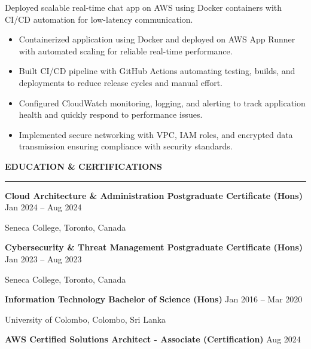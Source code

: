 \documentclass[10pt,letterpaper]{article}
\begin{document}
\vspace{-1pt}

Deployed scalable real-time chat app on AWS using Docker containers with CI/CD automation for low-latency communication.
\vspace{-1pt}
\begin{itemize}
\item Containerized application using Docker and deployed on AWS App Runner with automated scaling for reliable real-time performance.
\item Built CI/CD pipeline with GitHub Actions automating testing, builds, and deployments to reduce release cycles and manual effort.
\item Configured CloudWatch monitoring, logging, and alerting to track application health and quickly respond to performance issues.
\item Implemented secure networking with VPC, IAM roles, and encrypted data transmission ensuring compliance with security standards.
\end{itemize}

\vspace{6pt}

\textbf{EDUCATION \& CERTIFICATIONS}\\[-8pt]
\noindent\rule{\textwidth}{1pt}

\vspace{-2pt}

\textbf{Cloud Architecture \& Administration Postgraduate Certificate (Hons)} \hfill Jan 2024 -- Aug 2024

Seneca College, Toronto, Canada

\textbf{Cybersecurity \& Threat Management Postgraduate Certificate (Hons)} \hfill Jan 2023 -- Aug 2023

Seneca College, Toronto, Canada

\textbf{Information Technology Bachelor of Science (Hons)} \hfill Jan 2016 -- Mar 2020

University of Colombo, Colombo, Sri Lanka

\textbf{AWS Certified Solutions Architect - Associate (Certification)} \hfill Aug 2024
\end{document}

